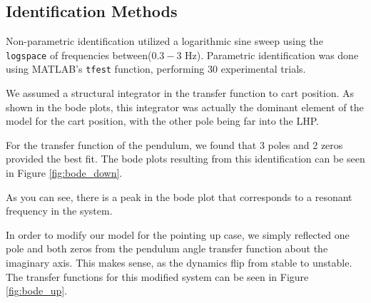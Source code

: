 \documentclass[12pt]{article}
\begin{document}
\subsection{Identification Methods}

Non-parametric identification utilized a logarithmic sine sweep using the \texttt{logspace} of frequencies between($0.3-3$ Hz). Parametric identification was done using MATLAB's \texttt{tfest} function, performing 30 experimental trials.

We assumed a structural integrator in the transfer function to cart position. As shown in the bode plots, this integrator was actually the dominant element of the model for the cart position, with the other pole being far into the LHP.

For the transfer function of the pendulum, we found that 3 poles and 2 zeros provided the best fit. The bode plots resulting from this identification can be seen in Figure \ref{fig:bode_down}.

As you can see, there is a peak in the bode plot that corresponds to a resonant frequency in the system.

In order to modify our model for the pointing up case, we simply reflected one pole and both zeros from the pendulum angle transfer function about the imaginary axis. This makes sense, as the dynamics flip from stable to unstable. The transfer functions for this modified system can be seen in Figure \ref{fig:bode_up}.
\end{document}
